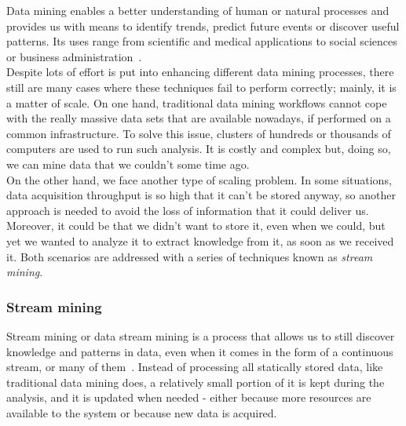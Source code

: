 Data mining enables a better understanding of human or natural processes and provides us with means to identify trends, predict future events or discover useful patterns. Its uses range from scientific and medical applications to social sciences or business administration~\cite{Fayyad:1996:DMK:257938.257942}.\\

Despite lots of effort is put into enhancing different data mining processes, there still are many cases where these techniques fail to perform correctly; mainly, it is a matter of scale. On one hand, traditional data mining workflows cannot cope with the really massive data sets that are available nowadays, if performed on a common infrastructure. To solve this issue, clusters of hundreds or thousands of computers are used to run such analysis. It is costly and complex but, doing so, we can mine data that we couldn’t some time ago.\\

On the other hand, we face another type of scaling problem. In some situations, data acquisition throughput is so high that it can’t be stored anyway, so another approach is needed to avoid the loss of information that it could deliver us. Moreover, it could be that we didn’t want to store it, even when we could, but yet we wanted to analyze it to extract knowledge from it, as soon as we received it. Both scenarios are addressed with a series of techniques known as \textit{stream mining}.

\subsubsection{Stream mining}

Stream mining or data stream mining is a process that allows us to still discover knowledge and patterns in data, even when it comes in the form of a continuous stream, or many of them~\cite{Rajaraman:2011:MMD:2124405}. Instead of processing all statically stored data, like traditional data mining does, a relatively small portion of it is kept during the analysis, and it is updated when needed - either because more resources are available to the system or because new data is acquired.\\


